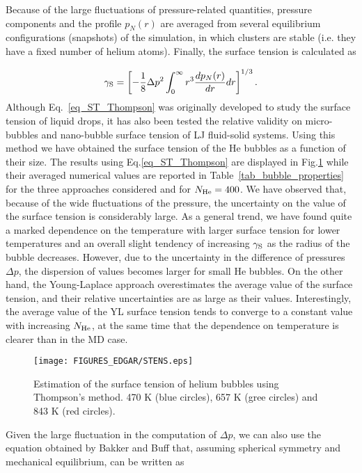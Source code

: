 \documentclass[jcp,amsmath,amssymb,preprint]{revtex4-1}
\begin{document}
Because of the large fluctuations of pressure-related quantities, pressure components and the profile $p_N(r)$ are averaged from several equilibrium configurations (snapshots) of the simulation, in which clusters are stable (i.e. they have a fixed number of helium atoms). Finally, the surface tension is calculated as

\begin{equation}
\gamma_{\rm S} = \left[ -\frac{1}{8} \Delta p^2 \int_0^\infty r^3 \frac{dp_N(r)}{dr} dr \right]^{1/3}.
            \label{eq_ST_Thompson}
\end{equation}
Although Eq.~\ref{eq_ST_Thompson} was originally developed to study the surface tension of liquid drops\cite{thompson1984molecular}, it has also been tested the relative validity on micro-bubbles\cite{park2001molecular} 
and nano-bubble surface tension of LJ fluid-solid systems\cite{rezaei2011molecular}.  Using this method we have obtained the surface tension of the He bubbles as a function of their size. The results using Eq.\ref{eq_ST_Thompson}
are displayed in Fig.\ref{fig:ST} while their averaged numerical values are reported in Table~\ref{tab_bubble_properties} for the three approaches considered and for $N_{\rm He} = 400$.  We have observed that, because of the wide fluctuations of the pressure, the uncertainty on the value of the surface tension is considerably large.  As a general trend, we have found quite a marked dependence on the temperature with larger surface tension for lower temperatures and an overall slight tendency of increasing $\gamma_{\rm S}$ as the radius of the bubble decreases. However, due to the uncertainty in the difference of pressures $\Delta p$, the dispersion of values becomes larger for small He bubbles.  On the other hand, the Young-Laplace approach overestimates the average value of the surface tension, and their relative uncertainties are as large as their values. Interestingly, the average value of the YL surface tension tends to converge to a constant value with increasing $N_{\rm He}$, at the same time that the dependence on temperature is clearer than in the MD case.
    
\begin{figure}
            \centering
            \texttt{[image: FIGURES\_EDGAR/STENS.eps]}
            \caption{Estimation of the surface tension of helium bubbles using Thompson's method.  470 K (blue circles), 657 K (gree circles) and 843 K (red circles).}
            \label{fig:ST}
\end{figure}
Given the large fluctuation in the computation of $\Delta p$, we can also use the equation obtained by Bakker and Buff\cite{thompson1984molecular} that, assuming spherical symmetry and mechanical equilibrium, can be written as 
\end{document}
